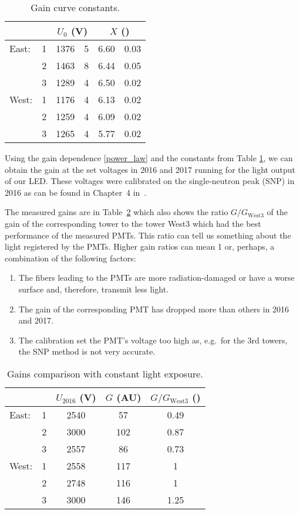 \documentclass[a4paper,10pt]{article}
\begin{document}
\begin{table}[htb]
\caption{\label{gainTable}Gain curve constants.}
\begin{center}
\begin{tabular}{lcr@{ $\pm$ }lr@{ $\pm$ }l}
\toprule
&&\multicolumn{2}{c}{$U_0$ (V)}&\multicolumn{2}{c}{$X$ ()}\\
\midrule
East:&1&1376&5&6.60&0.03\\
     &2&1463&8&6.44&0.05\\
     &3&1289&4&6.50&0.02\\
\midrule
West:&1&1176&4&6.13&0.02\\
     &2&1259&4&6.09&0.02\\
     &3&1265&4&5.77&0.02\\
\bottomrule
\end{tabular}
\end{center}
\end{table}

Using the gain dependence \eqref{power_law} and the constants from Table \ref{gainTable}, we can obtain the gain at the set voltages in 2016 and 2017 running for the light output of our LED\@. These voltages were calibrated on the single-neutron peak (SNP) in 2016 as can be found in Chapter~4 in~\cite{ZDC_ops_manual}\@. 

The measured gains are in Table~\ref{glassTable} which also shows the ratio $G/G_\text{West3}$ of the gain of the corresponding tower to the tower West3 which had the best performance of the measured PMTs\@. This ratio can tell us something about the light registered by the PMTs. Higher gain ratios can mean 1 or, perhaps, a combination of the following factors:
\begin{enumerate}
\item The fibers leading to the PMTs are more radiation-damaged or have a worse surface and, therefore, transmit less light.
\item The gain of the corresponding PMT has dropped more than others in 2016 and 2017.
\item The calibration set the PMT's voltage too high as, e.g.\ for the 3rd towers, the SNP method is not very accurate. 
\end{enumerate}


\begin{table}[htb]
\caption{\label{glassTable}Gains comparison with constant light exposure.}
\begin{center}
\begin{tabular}{lcccc}
\toprule
&&$U_\text{2016}$ (V)&$G$ (AU)& $G/G_\text{West3}$ ()\\
\midrule
East:&1&2540&57&0.49\\
&2&3000&102&0.87\\
&3&2557&86&0.73\\
\midrule
West:&1&2558&117&1\\
&2&2748&116&1\\
&3&3000&146&1.25\\
\bottomrule
\end{tabular}
\end{center}
\end{table}
\end{document}
